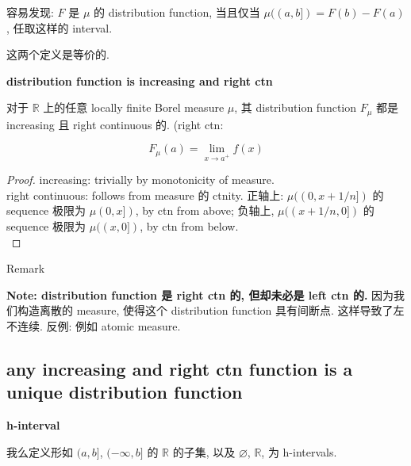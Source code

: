 \documentclass{qlnotes-export}
\begin{document}
\begin{proposition}

容易发现: \(F\) 是 \(\mu\) 的 distribution function, 当且仅当 \(\mu((a,b\rbrack) = F(b) - F(a)\), 任取这样的 interval.

\end{proposition}

这两个定义是等价的.

\begin{theorem}{\protect{}\label{kn-distribution-function-is-increasing-and-right-ctn}{\textbf{distribution
function is increasing and right ctn}}}

对于 \(\mathbb{R}\) 上的任意 locally finite Borel measure \(\mu\), 其 distribution function \(F_{\mu}\) 都是 increasing 且 right continuous 的. (right ctn:

\[F_{\mu}(a) = \lim\limits_{x\rightarrow a^{+}}f(x)\]

\end{theorem}

\begin{proof}

increasing: trivially by monotonicity of measure.\\
right continuous: follows from measure 的 ctnity. 正轴上: \(\mu((0,x + 1/n\rbrack)\) 的 sequence 极限为 \(\mu(0,x\rbrack)\), by ctn from above; 负轴上, \(\mu((x + 1/n,0\rbrack)\) 的 sequence 极限为 \(\mu((x,0\rbrack)\), by ctn from below.\\

\end{proof}

\begin{qlremark}{Remark}

\textbf{Note: distribution function 是 right ctn 的, 但却未必是 left ctn 的.} 因为我们构造离散的 measure, 使得这个 distribution function 具有间断点. 这样导致了左不连续. 反例: 例如 atomic measure.

\end{qlremark}

\subsection{any increasing and right ctn function is a unique distribution function}\label{any-increasing-and-right-ctn-function-is-a-unique-distribution-function}

\begin{definition}{\protect{}\label{kn-h-interval}{\textbf{h-interval}}}

我么定义形如 \((a,b\rbrack\), \(( - \infty,b\rbrack\) 的 \(\mathbb{R}\) 的子集, 以及 \(\varnothing\), \(\mathbb{R}\), 为 h-intervals.

\end{definition}
\end{document}
